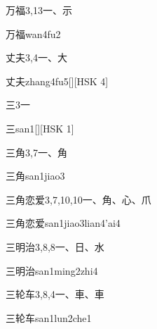 \begin{entry}{万福}{3,13}{⼀、⽰}
  \begin{phonetics}{万福}{wan4fu2}
  \end{phonetics}
\end{entry}

\begin{entry}{丈夫}{3,4}{⼀、⼤}
  \begin{phonetics}{丈夫}{zhang4fu5}[][HSK 4]
  \end{phonetics}
\end{entry}

\begin{entry}{三}{3}{⼀}
  \begin{phonetics}{三}{san1}[][HSK 1]
  \end{phonetics}
\end{entry}

\begin{entry}{三角}{3,7}{⼀、⾓}
  \begin{phonetics}{三角}{san1jiao3}
  \end{phonetics}
\end{entry}

\begin{entry}{三角恋爱}{3,7,10,10}{⼀、⾓、⼼、⽖}
  \begin{phonetics}{三角恋爱}{san1jiao3lian4'ai4}
  \end{phonetics}
\end{entry}

\begin{entry}{三明治}{3,8,8}{⼀、⽇、⽔}
  \begin{phonetics}{三明治}{san1ming2zhi4}
  \end{phonetics}
\end{entry}

\begin{entry}{三轮车}{3,8,4}{⼀、⾞、⾞}
  \begin{phonetics}{三轮车}{san1lun2che1}
  \end{phonetics}
\end{entry}

